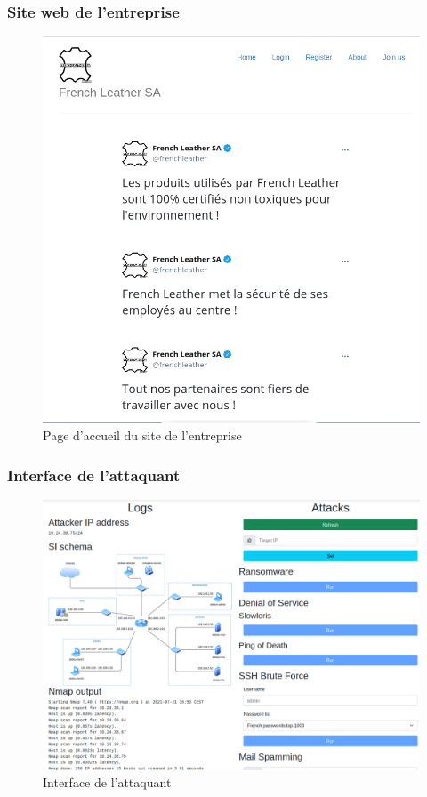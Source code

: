 \documentclass{beamer}
\begin{document}
		\begin{frame}
			\frametitle{Site web de l'entreprise}
			\begin{center}
				\begin{figure}
					\includegraphics[scale=.24]{www.png}
					\caption{Page d'accueil du site de l'entreprise}
				\end{figure}
			\end{center}
		\end{frame}
		\begin{frame}
			\frametitle{Interface de l'attaquant}
			\begin{center}
				\begin{figure}
					\includegraphics[scale=.2]{attacker.png}
					\caption{Interface de l'attaquant}
				\end{figure}
			\end{center}
		\end{frame}
\end{document}
